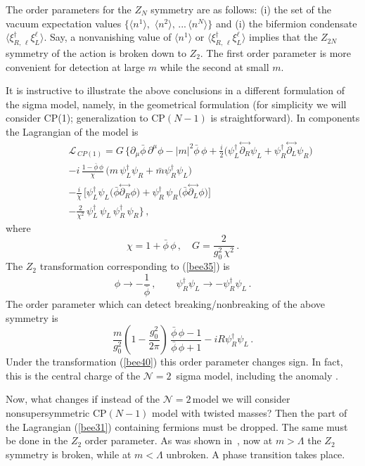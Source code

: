 \documentclass[epsfig,12pt]{article}
\def\beq{\begin{equation}}
\def\eeq{\end{equation}}
\def\beqn{\begin{eqnarray}}
\def\eeqn{\end{eqnarray}}
\newcommand{\ntwo}{${\mathcal N}=2\,$}
\def\beqn{\begin{eqnarray}}
\def\eeqn{\end{eqnarray}}
\def\beq{\begin{equation}}
\def\eeq{\end{equation}}
\begin{document}
{The order parameters for the $Z_N$ symmetry are as follows:
(i) the set of the vacuum expectation values
$\{ \langle n^1\rangle,\,\, \langle n^2\rangle, \,...\, \langle n^N\rangle\}$
and (i) the bifermion condensate $\langle  \xi^\dagger_{R,\,\ell}\xi^\ell_L\rangle$.
Say, a nonvanishing value of $\langle n^1\rangle$ or  $\langle  \xi^\dagger_{R,\,\ell}\xi^\ell_L\rangle$ implies that the $Z_{2N}$ symmetry of the action is broken down to
$Z_2$. The first order parameter is more convenient for detection
at large $m$ while the second at small $m$. 

It is instructive to illustrate the above conclusions
in a different formulation of the sigma model, namely, in the geometrical formulation
(for simplicity we will consider CP(1); generalization to CP$(N-1)$ is straightforward).
In components the Lagrangian of the model is
\beqn
&&
{\mathcal L}_{\,  CP(1)}= G\, \Big\{
\partial_\mu \bar{\phi}\, \partial^\mu\phi -|m|^2{\bar{\phi}\,\phi} 
+\frac{i}{2}\big(\psi_L^\dagger\!\stackrel{\leftrightarrow}{\partial_R}\!\psi_L 
+ \psi_R^\dagger\!\stackrel{\leftrightarrow}{\partial_L}\!\psi_R
\big)
\nonumber\\[1mm] 
&&
-i\,\frac{1-\bar{\phi}\,\phi}{\chi} \,\big(m\,\psi_L^\dagger \psi_R + \bar m
\psi_R^\dagger \psi_L
\big)
\nonumber\\[1mm] 
&&
-\frac{i}{\chi}\,  \big[\psi_L^\dagger \psi_L
\big(\bar{\phi} \!\stackrel{\leftrightarrow}{\partial_R}\!\phi
\big)+ \psi_R^\dagger\, \psi_R
\big(\bar{\phi}\!\stackrel{\leftrightarrow}{\partial_L}\!\phi
\big)
\big]
\nonumber\\[1mm]
&&
-
\frac{2}{\chi^2}\,\psi_L^\dagger\,\psi_L \,\psi_R^\dagger\,\psi_R
\Big\}\,,
\label{Aone}
\eeqn
where 
\beq
\chi = 1+\bar{\phi}\,\phi\,,\quad G= \frac{2}{g_0^2\,\chi^2}\,.
\eeq
The $Z_2$ transformation corresponding to (\ref{bee35}) is
\beq
\phi \to -\frac{1}{\bar{\phi}}\,,\qquad \psi_R^\dagger \psi_L\to -
\psi_R^\dagger \psi_L\,.
\label{bee40}
\eeq
 The order parameter which can detect breaking/nonbreaking of the above
symmetry is
\beq
\frac{m}{g_0^2} \left(1- \frac{g_0^2}{2\pi}
\right)\, \frac{\bar{\phi}\,\phi-1}{\bar{\phi}\,\phi+1} - 
i R \psi_R^\dagger \psi_L\,.
\eeq
Under the transformation (\ref{bee40}) this order parameter changes sign.
In fact, this is  the central charge of the \ntwo
sigma model, including the anomaly  \cite{svz}.

Now, what changes if instead of the \ntwo model we will consider nonsupersymmetric 
CP$(N-1)$ model with twisted masses? Then the part of the Lagrangian (\ref{bee31}) containing fermions must be dropped. The same must be done in the $Z_2$ order parameter.
As was shown in~\cite{GSY05,GSYphtr}, now at $m>\Lambda$ the $Z_2$ symmetry is broken, while at $m<\Lambda$ unbroken. A phase transition takes place.





}
\end{document}
